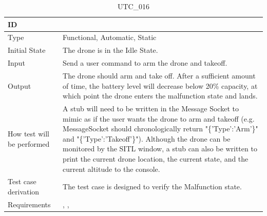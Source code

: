 \documentclass[12pt, titlepage]{article}
\begin{document}
\begin{table}[!h]
\begin{center}
\caption {UTC\_016}
\label{tab:UTC_016}
\begin{tabular}{ | m{3.2cm} | m{12.2cm} | } 
\hline
ID & \nameref{tab:UTC_016} \\ 
\hline
Type &  Functional, Automatic, Static  \\ 
\hline
Initial State & The drone is in the Idle State. \\ 
\hline
Input &  Send a user command to arm the drone and takeoff. \\ 
\hline
Output &  The drone should arm and take off. After a sufficient amount of time, the battery level will decrease below 20\% capacity, at which point the drone enters the malfunction state and lands.  \\ 
\hline
How test will be performed & A stub will need to be written in the Message Socket to mimic as if the user wants the drone to arm and takeoff (e.g. MessageSocket should chronologically return "\{'Type':'Arm'\}" and "\{'Type':'Takeoff'\}"). Although the drone can be monitored by the SITL window, a stub can also be written to print the current drone location, the current state, and the current altitude to the console.\\ 
\hline
Test case derivation &  The test case is designed to verify the Malfunction state. \\ 
\hline
Requirements & \nameref{STA_009}, \nameref{SR_007}, \nameref{SR_011} \\ 
\hline
\end{tabular}
\end{center}
\end{table}
\end{document}
